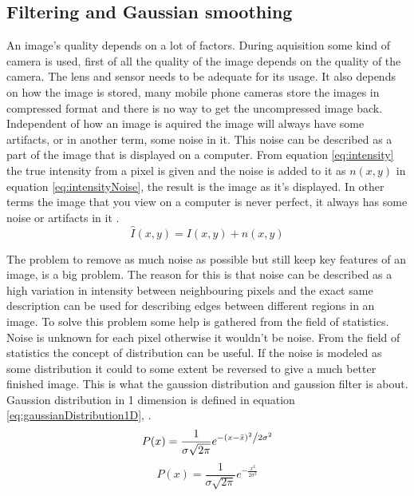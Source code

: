 \subsection{Filtering and Gaussian smoothing}
An image's quality depends on a lot of factors. During aquisition some kind of
camera is used, first of all the quality of the image depends on the quality
of the camera. The lens and sensor needs to be adequate for its usage.
It also depends on how the image is stored, many mobile phone cameras store
the images in compressed format and there is no way to get the uncompressed
image back. Independent of how an image is aquired the image will always have
some artifacts, or in another term, some noise in it. This noise can be described
as a part of the image that is displayed on a computer. From equation \ref{eq:intensity}
 the true intensity from a pixel is given and the noise is added to it as \(n(x,y)\) in
 equation \ref{eq:intensityNoise}, the result is the image as it's displayed. In other
 terms the image that you view on a computer is never perfect, it always has some
 noise or artifacts in it \cite[p. 76]{gonzalez2008}.
\begin{equation}
    \label{eq:intensityNoise}
    \hat{I}(x,y) = I(x,y) + n(x,y)
\end{equation}

The problem to remove as much noise as possible but still keep key features of
an image, is a big problem. The reason for this is that noise can be described
as a high variation in intensity between neighbouring pixels and the exact
same description can be used for describing edges between different regions
in an image. To solve this problem some help is gathered from the field of
statistics. Noise is unknown for each pixel otherwise it wouldn't be noise.
From the field of statistics the concept of distribution can be
useful. If the noise is modeled as some distribution it could to some extent
be reversed to give a much better finished image. This is what the
gaussion distribution and gaussion filter is about. Gaussion distribution in 1
dimension is defined in equation \ref{eq:gaussianDistribution1D}, \cite[p. 314]{gonzalez2008}.
\begin{equation}
    \label{eq:gaussianDistribution1D}
    P(x) = \frac{1}{{\sigma \sqrt {2\pi } }}e^{{{ - \left( {x - \bar{x}} \right)^2 } \mathord{\left/ {\vphantom {{ - \left( {x - \mu } \right)^2 } {2\sigma ^2 }}} \right. \kern-\nulldelimiterspace} {2\sigma ^2 }}}
\end{equation}
\begin{equation}
    \label{eq:gaussianDistribution1DZeroMean}
    P(x) = \frac{1}{{\sigma \sqrt {2\pi } }}e^{-\frac{x^2}{2 \sigma^2}}
\end{equation}

